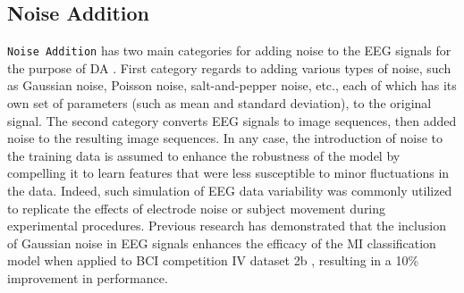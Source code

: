 \documentclass[12pt]{iopart}
\begin{document}
\subsection{Noise Addition}
\texttt{Noise Addition} has two main categories for adding noise to the EEG signals for the purpose of DA \cite{lashgari2020data}.  First category regards to adding various types of noise, such as Gaussian noise, Poisson noise, salt-and-pepper noise, etc., each of which has its own set of parameters (such as mean and standard deviation), to the original signal.  The second category converts EEG signals to image sequences, then added noise to the resulting image sequences. In any case, the introduction of noise to the training data is assumed to enhance the robustness of the model by compelling it to learn features that were less susceptible to minor fluctuations in the data.  Indeed, such simulation of EEG data variability was commonly utilized to replicate the effects of electrode noise or subject movement during experimental procedures.  Previous research has demonstrated that the inclusion of Gaussian noise in EEG signals enhances the efficacy of the MI classification model when applied to BCI competition IV dataset 2b \cite{brunner2008bci} , resulting in a 10\% improvement in performance.



\end{document}
